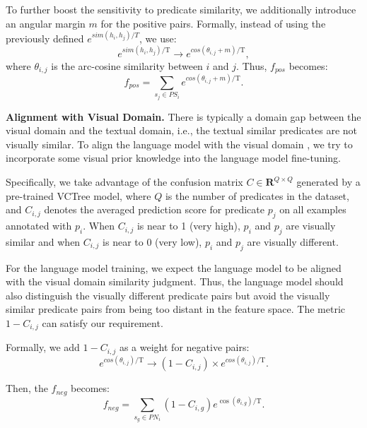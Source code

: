\documentclass[letterpaper]{article} %
\begin{document}
To further boost the sensitivity to predicate similarity, we additionally introduce an angular margin $m$ for the positive pairs.
Formally, instead of using the previously defined $e^{sim ( h_{i},h_{j} )/T}$, we use:
\begin{equation}
e^{sim ( h_{i},h_{j} )/\mathrm{T}} \to e^{cos ( \theta _{i,j}+m )/\mathrm{T} },
\end{equation}
where $ \theta _{i,j} $ is the arc-cosine similarity between $ i $ and $ j $.
Thus, $f_{pos}$ becomes:
\begin{equation}
    f_{pos} = \sum_{s_{j} \in P S_{i}} e^{cos ( \theta _{i,j}+m )/\mathrm{T}}.
\end{equation}


\noindent \textbf{Alignment with Visual Domain.} There is typically a domain gap between the visual domain and the textual domain, i.e., the textual similar predicates are not visually similar.
To align the language model with the visual domain \cite{li2023winner,fang2022multi}, we try to incorporate some visual prior knowledge into the language model fine-tuning.

Specifically, we take advantage of the confusion matrix $C \in \mathbf{R}^{Q\times Q}$ generated by a pre-trained VCTree model, where $ Q $ is the number of predicates in the dataset, and $C_{i,j}$ denotes the averaged prediction score for predicate $p_j$ on all examples annotated with $p_i$.
When $C_{i,j}$ is near to 1 (very high), $p_i$ and $p_j$ are visually similar and when $C_{i,j}$ is near to 0 (very low), $p_i$ and $p_j$ are visually different.

For the language model training, we expect the language model to be aligned with the visual domain similarity judgment.
Thus, the language model should also distinguish the visually different predicate pairs but avoid the visually similar predicate pairs from being too distant in the feature space.
The metric $1-C_{i,j}$ can satisfy our requirement.

Formally, we add $1-C_{i,j}$ as a weight for negative pairs:
\begin{equation}
    e^{cos\left ( \theta _{i,j}    \right )/\mathrm{T} } \to \left ( 1-C_{i,j}  \right ) \times e^{cos\left ( \theta _{i,j}    \right )/\mathrm{T} }.
\end{equation}

Then, the $f_{neg}$ becomes:
\begin{equation}
    f_{neg} = \sum_{s_{g} \in PN_{i}} \left (1-C_{i,g}   \right )e^{\cos\left(\theta_{i,g}\right) / \mathrm{T}}.
\end{equation}
\end{document}
